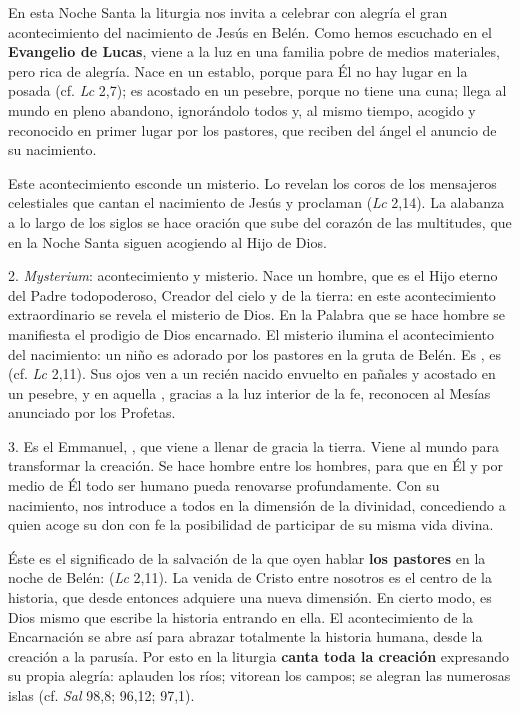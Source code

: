 \begin{body}
\begin{body}
En esta Noche Santa la liturgia nos invita a celebrar con alegría el gran acontecimiento del nacimiento de Jesús en Belén. Como hemos escuchado en el \textbf{Evangelio de Lucas}, viene a la luz en una familia pobre de medios materiales, pero rica de alegría. Nace en un establo, porque para Él no hay lugar en la posada (cf. \emph{Lc} 2,7); es acostado en un pesebre, porque no tiene una cuna; llega al mundo en pleno abandono, ignorándolo todos y, al mismo tiempo, acogido y reconocido en primer lugar por los pastores, que reciben del ángel el anuncio de su nacimiento.

Este acontecimiento esconde un misterio. Lo revelan los coros de los mensajeros celestiales que cantan el nacimiento de Jesús y proclaman  (\emph{Lc} 2,14). La alabanza a lo largo de los siglos se hace oración que sube del corazón de las multitudes, que en la Noche Santa siguen acogiendo al Hijo de Dios.

2. \emph{Mysterium}: acontecimiento y misterio. Nace un hombre, que es el Hijo eterno del Padre todopoderoso, Creador del cielo y de la tierra: en este acontecimiento extraordinario se revela el misterio de Dios. En la Palabra que se hace hombre se manifiesta el prodigio de Dios encarnado. El misterio ilumina el acontecimiento del nacimiento: un niño es adorado por los pastores en la gruta de Belén. Es , es  (cf. \emph{Lc} 2,11). Sus ojos ven a un recién nacido envuelto en pañales y acostado en un pesebre, y en aquella , gracias a la luz interior de la fe, reconocen al Mesías anunciado por los Profetas.

3. Es el Emmanuel, , que viene a llenar de gracia la tierra. Viene al mundo para transformar la creación. Se hace hombre entre los hombres, para que en Él y por medio de Él todo ser humano pueda renovarse profundamente. Con su nacimiento, nos introduce a todos en la dimensión de la divinidad, concediendo a quien acoge su don con fe la posibilidad de participar de su misma vida divina.

Éste es el significado de la salvación de la que oyen hablar \textbf{los pastores} en la noche de Belén:  (\emph{Lc} 2,11). La venida de Cristo entre nosotros es el centro de la historia, que desde entonces adquiere una nueva dimensión. En cierto modo, es Dios mismo que escribe la historia entrando en ella. El acontecimiento de la Encarnación se abre así para abrazar totalmente la historia humana, desde la creación a la parusía. Por esto en la liturgia \textbf{canta toda la creación} expresando su propia alegría: aplauden los ríos; vitorean los campos; se alegran las numerosas islas (cf. \emph{Sal} 98,8; 96,12; 97,1).


\end{body}
\end{body}

